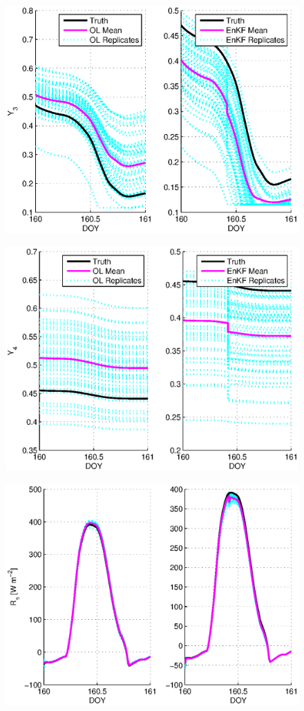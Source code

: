 \documentclass[letterpaper]{tufte-handout}
\begin{document}
\begin{figure}
  \includegraphics[width=\textwidth]{4cy3}
  \caption{}
\end{figure}
\begin{figure}
  \includegraphics[width=\textwidth]{4cy4}
  \caption{}
\end{figure}
\begin{figure}
  \includegraphics[width=\textwidth]{4cr}
  \caption{}
\end{figure}
\end{document}
